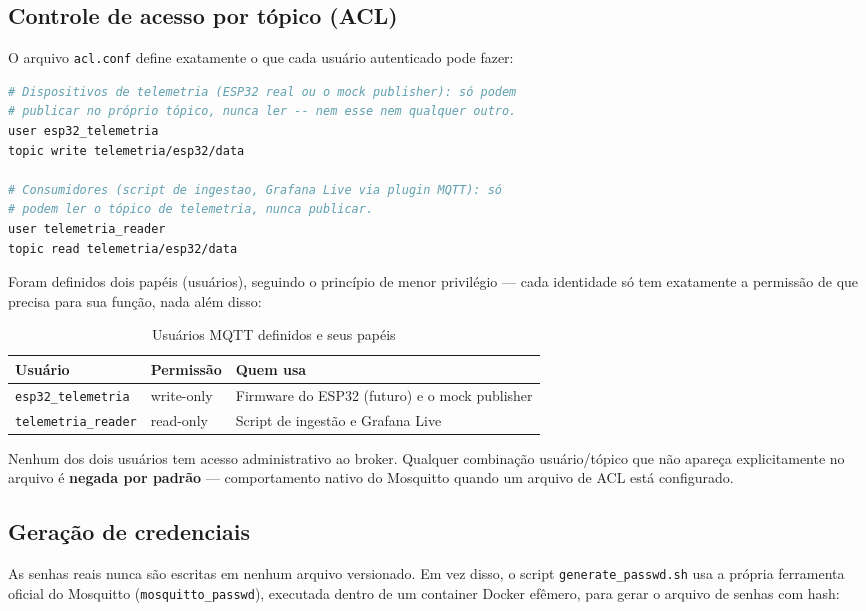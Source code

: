 \documentclass[11pt,a4paper]{article}
\begin{document}
\subsection{Controle de acesso por tópico (ACL)}
\label{sec:acl}

O arquivo \texttt{acl.conf} define exatamente o que cada usuário autenticado pode fazer:

\begin{lstlisting}[language=bash,caption={infra/mosquitto/config/acl.conf}]
# Dispositivos de telemetria (ESP32 real ou o mock publisher): só podem
# publicar no próprio tópico, nunca ler -- nem esse nem qualquer outro.
user esp32_telemetria
topic write telemetria/esp32/data

# Consumidores (script de ingestao, Grafana Live via plugin MQTT): só
# podem ler o tópico de telemetria, nunca publicar.
user telemetria_reader
topic read telemetria/esp32/data
\end{lstlisting}

Foram definidos dois papéis (usuários), seguindo o princípio de menor privilégio --- cada identidade só tem exatamente a permissão de que precisa para sua função, nada além disso:

\begin{table}[h]
\centering
\begin{tabular}{@{}lll@{}}
\toprule
\textbf{Usuário} & \textbf{Permissão} & \textbf{Quem usa} \\
\midrule
\texttt{esp32\_telemetria} & write-only & Firmware do ESP32 (futuro) e o mock publisher \\
\texttt{telemetria\_reader} & read-only & Script de ingestão e Grafana Live \\
\bottomrule
\end{tabular}
\caption{Usuários MQTT definidos e seus papéis}
\end{table}

Nenhum dos dois usuários tem acesso administrativo ao broker. Qualquer combinação usuário/tópico que não apareça explicitamente no arquivo é \textbf{negada por padrão} --- comportamento nativo do Mosquitto quando um arquivo de ACL está configurado.

\subsection{Geração de credenciais}
\label{sec:credenciais}

As senhas reais nunca são escritas em nenhum arquivo versionado. Em vez disso, o script \texttt{generate\_passwd.sh} usa a própria ferramenta oficial do Mosquitto (\texttt{mosquitto\_passwd}), executada dentro de um container Docker efêmero, para gerar o arquivo de senhas com hash:
\end{document}
